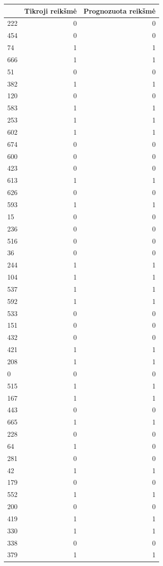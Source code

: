 \begin{tabular}{lrr}
\toprule
 & Tikroji reikšmė & Prognozuota reikšmė \\
\midrule
222 & 0 & 0 \\
454 & 0 & 0 \\
74 & 1 & 1 \\
666 & 1 & 1 \\
51 & 0 & 0 \\
382 & 1 & 1 \\
120 & 0 & 0 \\
583 & 1 & 1 \\
253 & 1 & 1 \\
602 & 1 & 1 \\
674 & 0 & 0 \\
600 & 0 & 0 \\
423 & 0 & 0 \\
613 & 1 & 1 \\
626 & 0 & 0 \\
593 & 1 & 1 \\
15 & 0 & 0 \\
236 & 0 & 0 \\
516 & 0 & 0 \\
36 & 0 & 0 \\
244 & 1 & 1 \\
104 & 1 & 1 \\
537 & 1 & 1 \\
592 & 1 & 1 \\
533 & 0 & 0 \\
151 & 0 & 0 \\
432 & 0 & 0 \\
421 & 1 & 1 \\
208 & 1 & 1 \\
0 & 0 & 0 \\
515 & 1 & 1 \\
167 & 1 & 1 \\
443 & 0 & 0 \\
665 & 1 & 1 \\
228 & 0 & 0 \\
64 & 1 & 0 \\
281 & 0 & 0 \\
42 & 1 & 1 \\
179 & 0 & 0 \\
552 & 1 & 1 \\
200 & 0 & 0 \\
419 & 1 & 1 \\
330 & 1 & 1 \\
338 & 0 & 0 \\
379 & 1 & 1 \\

\end{tabular}
